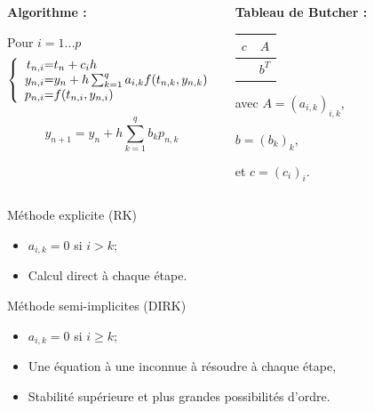 \documentclass[11pt]{beamer}
\begin{document}
\begin{frame}
\begin{columns}
\begin{block}{\textbf{Algorithme :}}

Pour $i=1...p$
\[
\left \{
\begin{array}{r @{=} l}
    t_{n,i} & t_n + c_i h \\
    y_{n,i} & y_n + h \sum_{k=1}^q a_{i,k}f(t_{n,k} , y_{n,k}) \\
    p_{n,i} & f( t_{n,i} , y_{n,i} )
\end{array}
\right.
\]

$$y_{n+1} = y_n + h \sum_{k=1}^q b_k p_{n,k}$$
\end{block}

\pause
{}
\begin{block}{\textbf{Tableau de Butcher :}}

\begin{tabular}{c|c}
$c$ & $A$\\
\hline
    & $b^T$
\end{tabular}

avec $A=(a_{i,k})_{i,k}$,

$b=(b_k)_k$,

et $c=(c_i)_i$.
\end{block}
\end{columns}

\end{frame}

\begin{frame}
\begin{block}{Méthode explicite (RK)}
\begin{itemize}
\item $a_{i,k} = 0$ si $i > k$;
\item Calcul direct à chaque étape.
\end{itemize}
\end{block}

\begin{block}{Méthode semi-implicites (DIRK)}
\begin{itemize}
\item $a_{i,k} = 0$ si $i \geq k$;
\item Une équation à une inconnue à résoudre à chaque étape,
\item Stabilité supérieure et plus grandes possibilités d'ordre.
\end{itemize}
\end{block}

\end{frame}
\end{document}
